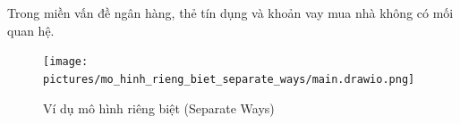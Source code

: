 











\begin{example} Trong miền vấn đề ngân hàng, thẻ tín dụng và khoản vay mua nhà không có mối quan hệ.

\begin{figure}[H]

\centering

\texttt{[image: pictures/mo\_hinh\_rieng\_biet\_separate\_ways/main.drawio.png]}

\caption{Ví dụ mô hình riêng biệt (Separate Ways)}

\end{figure}

\end{example}



% 


% 


